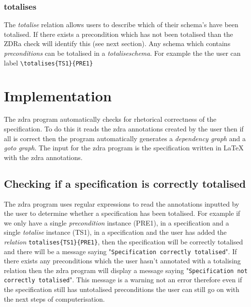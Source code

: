 \subsubsection{totalises}
The \emph{totalise} relation allows users to describe which of their schema's
have been totalised. If there exists a precondition which has not been totalised
than the ZDRa check will identify this (see next section). Any schema which
contains \emph{preconditions} can be totalised in a \emph{totaliseschema}. For
example the the user can label \verb|\totalises{TS1}{PRE1}|


\section{Implementation}
\label{sec:zdra_implement}

The \gls{zdra} program automatically checks for rhetorical correctness of the
specification. To do this it reads the \gls{zdra} annotations created by the
user then if all is correct then the program automatically generates a
\emph{dependency graph} and a \emph{goto graph}. The input for the \gls{zdra}
program is the specification written in \LaTeX{} with the \gls{zdra}
annotations.

\subsection{Checking if a specification is correctly totalised}
\label{subsec:correctlytotalised}

The \gls{zdra} program uses regular expressions to read the annotations inputted
by the user to determine whether a specification has been totalised. For example
if we only have a single \emph{precondition} instance (PRE1), in a specification
and a single \emph{totalise} instance (TS1), in a specification and the user has
added the \emph{relation} \verb|totalises{TS1}{PRE1}|, then the specification
will be correctly totalised and there will be a message saying
"\texttt{Specification correctly totalised}". If there exists any preconditions
which the user hasn't annotated with a totalising relation then the \gls{zdra}
program will display a message saying "\texttt{Specification not correctly
totalised}". This message is a warning not an error therefore even if the
specification still has untotalised preconditions the user can still go on with
the next steps of computerisation.

